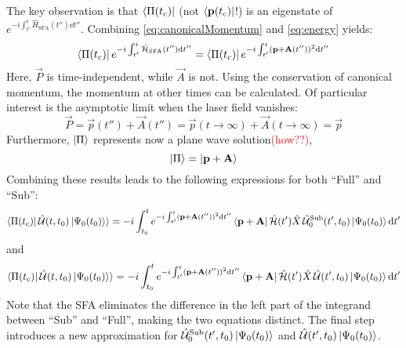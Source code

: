 The key observation is that $\bra{\Pi(t_{\mathrm{c}})}$ (not $\bra{\mathbf{p}(t_{\mathrm{c}})}$!) is an eigenstate of $e^{-i \int_{t'}^{t} \hat{H}_{\mathrm{SFA}}(t'') \dd t''}$. 
Combining \eqref{eq:canonicalMomentum} and \eqref{eq:energy} yields:
\begin{equation*}
    \bra{\Pi(t_c)}e^{-i \int_{t'}^{t} \hat{\mathcal{H}}_{\mathrm{SFA}}(t'') \mathrm{d} t''} = \bra{\Pi(t_c)}e^{-i \int_{t'}^{t} (\mathbf{p} + \mathbf{A}(t''))^2 \mathrm{d} t''}
\end{equation*}
Here, $\vec{P}$ is time-independent, while $\vec{A}$ is not.
Using the conservation of canonical momentum, the momentum at other times can be calculated. 
Of particular interest is the asymptotic limit when the laser field vanishes:
\begin{equation*}
    \vec{P} = \vec{p}(t'') + \vec{A}(t'') = \vec{p}(t\rightarrow \infty) + \vec{A}(t\rightarrow \infty) = \vec{p}
\end{equation*}
Furthermore, $\ket{\Pi}$ represents now a plane wave solution\textcolor{red}{(how??)},
\begin{equation*}
    \ket{\Pi} = \ket{\mathbf{p}+\mathbf{A}}
\end{equation*}
Combining these results leads to the following expressions for both ``Full'' and ``Sub'':
\begin{equation}
    \braket{\Pi(t_{\mathrm{c}})|\,\hat{\mathcal{U}}(t,t_0)\ket{\Psi_0(t_0)}} = -i \int_{t_0}^{t} e^{-i \int_{t'}^{t} (\mathbf{p} + \mathbf{A}(t''))^2 \mathrm{d} t''}\bra{\mathbf{p}+\mathbf{A}}\hat{\mathcal{H}}(t')\hat{X}\, \hat{\mathcal{U}}^{\mathrm{Sub}}_0(t',t_0)\ket{\Psi_0(t_0)} \mathrm{d} t' \label{eq:smatrixlike1}
\end{equation}
and
\begin{equation}
    \braket{\Pi(t_{\mathrm{c}})|\,\hat{\mathcal{U}}(t,t_0)\ket{\Psi_0(t_0)}} = -i \int_{t_0}^{t} e^{-i \int_{t'}^{t} (\mathbf{p} + \mathbf{A}(t''))^2 \mathrm{d} t''}\bra{\mathbf{p}+\mathbf{A}}\hat{\mathcal{H}}(t')\hat{X}\, \hat{\mathcal{U}}(t',t_0)\ket{\Psi_0(t_0)} \mathrm{d} t' \label{eq:smatrixlike2}
\end{equation}
Note that the SFA eliminates the difference in the left part of the integrand between ``Sub'' and ``Full'', making the two equations distinct. 
The final step introduces a new approximation for $\hat{\mathcal{U}}^{\mathrm{Sub}}_0(t',t_0)\ket{\Psi_0(t_0)}$ and $\hat{\mathcal{U}}(t',t_0)\ket{\Psi_0(t_0)}$.

